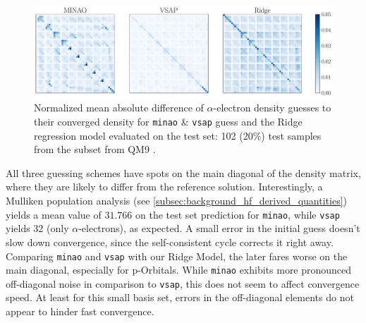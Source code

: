 \begin{figure}[H]
    \centering
    \includegraphics[width=\textwidth]{../fig/c5h4n2o2/density_error_comparison.pdf}
    \caption[Normalized difference of density guesses]{Normalized mean absolute difference of $\alpha$-electron density guesses to their converged density for \texttt{minao} \& \texttt{vsap} guess and the Ridge regression model evaluated on the test set: 102 (20\%) test samples from the  subset from QM9 \parencite{ref:article1_qm9}.}
    \label{fig:density_error_comparison}
\end{figure}
All three guessing schemes have spots on the main diagonal of the density matrix, where they are likely to differ from the reference solution. Interestingly, a Mulliken population analysis (see \autoref{subsec:background_hf_derived_quantities}) \parencite{ref:Mulliken_population_analysis} yields a mean value of $31.766$ on the test set prediction for \texttt{minao}, while \texttt{vsap} yields $32$ (only $\alpha$-electrons), as expected. A small error in the initial guess doesn't slow down convergence, since the self-consistent cycle corrects it right away. Comparing \texttt{minao} and \texttt{vsap} with our Ridge Model, the later fares worse on the main diagonal, especially for p-Orbitals. While \texttt{minao} exhibits more pronounced off-diagonal noise in comparison to \texttt{vsap}, this does not seem to affect convergence speed. At least for this small basis set, errors in the off-diagonal elements do not appear to hinder fast convergence.\\

